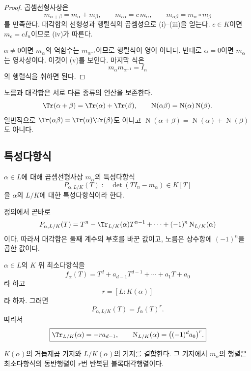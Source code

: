 \begin{proof}
곱셈선형사상은
\[
  m_{\alpha+\beta}=m_\alpha+m_\beta,
  \qquad
  m_{c\alpha}=c\,m_\alpha,
  \qquad
  m_{\alpha\beta}=m_\alpha\circ m_\beta
\]
를 만족한다. 대각합의 선형성과 행렬식의 곱셈성으로 (i)--(iii)을 얻는다. $c\in K$이면 $m_c=cI_n$이므로 (iv)가 따른다.

$\alpha\ne0$이면 $m_\alpha$의 역함수는 $m_{\alpha^{-1}}$이므로 행렬식이 영이 아니다. 반대로 $\alpha=0$이면 $m_\alpha$는 영사상이다. 이것이 (v)를 보인다. 마지막 식은
\[
  m_\alpha m_{\alpha^{-1}}=I_n
\]
의 행렬식을 취하면 된다.
\end{proof}

\begin{pitfall}
노름과 대각합은 서로 다른 종류의 연산을 보존한다.
\[
  \Tr(\alpha+\beta)=\Tr(\alpha)+\Tr(\beta),
  \qquad
  \operatorname N(\alpha\beta)=\operatorname N(\alpha)\operatorname N(\beta).
\]
일반적으로 $\Tr(\alpha\beta)=\Tr(\alpha)\Tr(\beta)$도 아니고
$\operatorname N(\alpha+\beta)=\operatorname N(\alpha)+\operatorname N(\beta)$도 아니다.
\end{pitfall}

\subsection{특성다항식}

\begin{definition}
\label{def:element-characteristic-polynomial}
$\alpha\in L$에 대해 곱셈선형사상 $m_\alpha$의 특성다항식
\[
  P_{\alpha,L/K}(T)
  :=\det(TI_n-m_\alpha)\in K[T]
\]
을 $\alpha$의 $L/K$에 대한 특성다항식이라 한다.
\end{definition}

정의에서 곧바로
\[
  P_{\alpha,L/K}(T)
  =T^n-\Tr_{L/K}(\alpha)T^{n-1}
  +\cdots+(-1)^n\operatorname N_{L/K}(\alpha)
\]
이다. 따라서 대각합은 둘째 계수의 부호를 바꾼 값이고, 노름은 상수항에 $(-1)^n$을 곱한 값이다.

\begin{theorem}
\label{thm:characteristic-minimal-power}
$\alpha\in L$의 $K$ 위 최소다항식을
\[
  f_\alpha(T)
  =T^d+a_{d-1}T^{d-1}+\cdots+a_1T+a_0
\]
라 하고
\[
  r=[L:K(\alpha)]
\]
라 하자. 그러면
\[
  \boxed{P_{\alpha,L/K}(T)=f_\alpha(T)^r.}
\]
따라서
\[
  \boxed{
  \Tr_{L/K}(\alpha)=-r a_{d-1},
  \qquad
  \operatorname N_{L/K}(\alpha)
  =\bigl((-1)^d a_0\bigr)^r.}
\]
\end{theorem}

\begin{proofidea}
$K(\alpha)$의 거듭제곱 기저와 $L/K(\alpha)$의 기저를 결합한다. 그 기저에서 $m_\alpha$의 행렬은 최소다항식의 동반행렬이 $r$번 반복된 블록대각행렬이다.
\end{proofidea}

